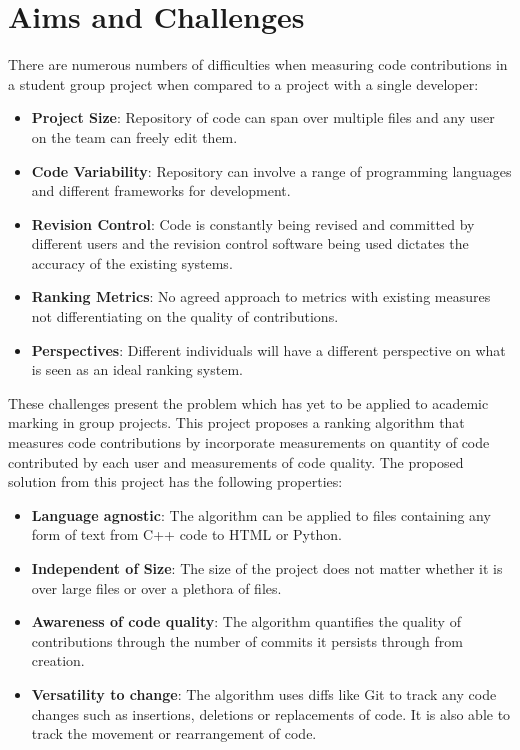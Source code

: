\documentclass[11pt]{informatics-report}
\begin{document}
\section{Aims and Challenges}
There are numerous numbers of difficulties when measuring code contributions in a student group project when compared to a project with a single developer:
\begin{itemize}
    \item \textbf{Project Size}: Repository of code can span over multiple files and any user on the team can freely edit them. 
    \item \textbf{Code Variability}: Repository can involve a range of programming languages and different frameworks for development.
    \item \textbf{Revision Control}: Code is constantly being revised and committed by different users and the revision control software being used dictates the accuracy of the existing systems.
    \item \textbf{Ranking Metrics}: No agreed approach to metrics with existing measures not differentiating on the quality of contributions.
    \item \textbf{Perspectives}: Different individuals will have a different perspective on what is seen as an ideal ranking system.
\end{itemize}

These challenges present the problem which has yet to be applied to academic marking in group projects. This project proposes a ranking algorithm that measures code contributions by incorporate measurements on quantity of code contributed by each user and measurements of code quality. The proposed solution from this project has the following properties:
\begin{itemize}
    \item \textbf{Language agnostic}: The algorithm can be applied to files containing any form of text from C++ code to HTML or Python. 
    \item \textbf{Independent of Size}: The size of the project does not matter whether it is over large files or over a plethora of files.
    \item \textbf{Awareness of code quality}: The algorithm quantifies the quality of contributions through the number of commits it persists through from creation.
    \item \textbf{Versatility to change}: The algorithm uses diffs like Git to track any code changes such as insertions, deletions or replacements of code. It is also able to track the movement or rearrangement of code.

\end{itemize}
\end{document}

